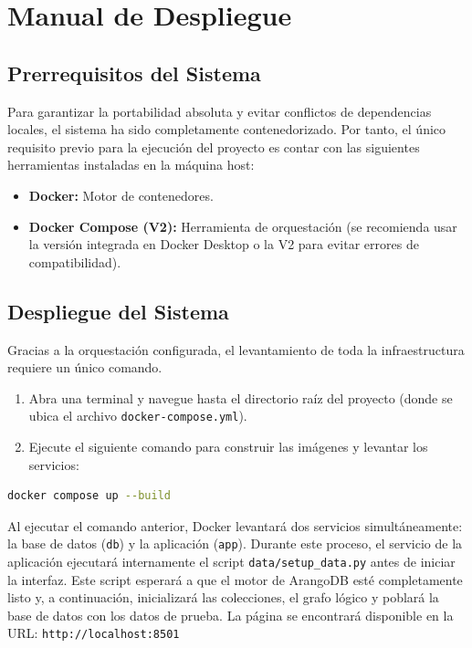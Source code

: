 \chapter{Manual de Despliegue}\label{cap:manual_de_despliegue}

\section{Prerrequisitos del Sistema}
Para garantizar la portabilidad absoluta y evitar conflictos de dependencias locales, el sistema ha sido completamente contenedorizado. Por tanto, el único requisito previo para la ejecución del proyecto es contar con las siguientes herramientas instaladas en la máquina host:
\begin{itemize}
    \item \textbf{Docker:} Motor de contenedores.
    \item \textbf{Docker Compose (V2):} Herramienta de orquestación (se recomienda usar la versión integrada en Docker Desktop o la V2 para evitar errores de compatibilidad).
\end{itemize}

\section{Despliegue del Sistema}
Gracias a la orquestación configurada, el levantamiento de toda la infraestructura requiere un único comando.
\begin{enumerate}
    \item Abra una terminal y navegue hasta el directorio raíz del proyecto (donde se ubica el archivo \texttt{docker-compose.yml}).
    \item Ejecute el siguiente comando para construir las imágenes y levantar los servicios:
\end{enumerate}

\begin{lstlisting}[language=bash, caption=Comando de despliegue]
docker compose up --build
\end{lstlisting}

Al ejecutar el comando anterior, Docker levantará dos servicios simultáneamente: la base de datos (\texttt{db}) y la aplicación (\texttt{app}). Durante este proceso, el servicio de la aplicación ejecutará internamente el script \texttt{data/setup\_data.py} antes de iniciar la interfaz. Este script esperará a que el motor de ArangoDB esté completamente listo y, a continuación, inicializará las colecciones, el grafo lógico y poblará la base de datos con los datos de prueba.
La página se encontrará disponible en la URL: \texttt{http://localhost:8501}
